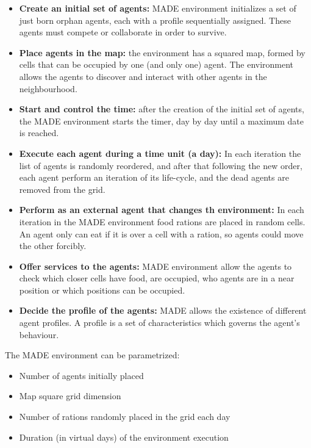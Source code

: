 \documentclass[runningheads]{llncs}
\begin{document}
\begin{itemize}
\item \textbf{Create an initial set of agents:} MADE environment initializes a set of just born orphan agents, each with a profile sequentially assigned. These agents must compete or collaborate in order to survive.
\item \textbf{Place agents in the map:} the environment has a squared map, formed by cells that can be occupied by one (and only one) agent. The environment allows the agents to discover and interact with other agents in the neighbourhood.
\item \textbf{Start and control the time:} after the creation of the initial set of agents, the MADE environment starts the timer, day by day until a maximum date is reached.
\item \textbf{Execute each agent during a time unit (a day):} In each iteration the list of agents is randomly reordered, and after that following the new order, each agent perform an iteration of its life-cycle, and the dead agents are removed from the grid.
\item \textbf{Perform as an external agent that changes th environment:} In each iteration in the MADE environment food rations are placed in random cells. An agent only can eat if it is over a cell with a ration, so agents could move the other forcibly.
\item \textbf{Offer services to the agents:} MADE environment allow the agents to check which closer cells have food, are occupied, who agents are in a near position or which positions can be occupied.
\item \textbf{Decide the profile of the agents:} MADE allows the existence of different agent profiles. A profile is a set of characteristics which governs the agent's behaviour.
\end{itemize}

The MADE environment can be parametrized:


\begin{itemize}
\item Number of agents initially placed
\item Map square grid dimension
\item Number of rations randomly placed in the grid each day
\item Duration (in virtual days) of the environment execution
\end{itemize}
\end{document}
